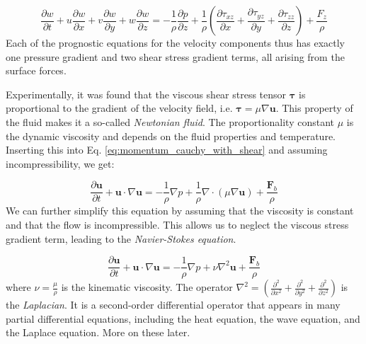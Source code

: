 \documentclass[12pt]{article}
\numberwithin{equation}{section}
\numberwithin{figure}{section}
\numberwithin{table}{section}
\begin{document}
\begin{equation}
  \frac{\partial w}{\partial t} + 
  u \frac{\partial w}{\partial x} + 
  v \frac{\partial w}{\partial y} + 
  w \frac{\partial w}{\partial z} = 
  - \frac{1}{\rho} \frac{\partial p}{\partial z} + 
  \frac{1}{\rho} \left( \frac{\partial \tau_{xz}}{\partial x} + \frac{\partial \tau_{yz}}{\partial y} + \frac{\partial \tau_{zz}}{\partial z} \right) + 
  \frac{F_z}{\rho}
\end{equation}
Each of the prognostic equations for the velocity components thus has exactly
one pressure gradient and two shear stress gradient terms, all arising from the
surface forces.

Experimentally, it was found that the viscous shear stress tensor $\boldsymbol{\tau}$
is proportional to the gradient of the velocity field, i.e. $\boldsymbol{\tau} = \mu \nabla \mathbf{u}$.
This property of the fluid makes it a so-called \textit{Newtonian fluid}.
The proportionality constant $\mu$ is the dynamic viscosity and depends on the
fluid properties and temperature.
Inserting this into Eq. \ref{eq:momentum_cauchy_with_shear} and assuming
incompressibility, we get:

\begin{equation}
  \frac{\partial \mathbf{u}}{\partial t} + \mathbf{u} \cdot \nabla \mathbf{u} =
  - \frac{1}{\rho} \nabla p + \frac{1}{\rho} \nabla \cdot (\mu \nabla \mathbf{u}) +
  \frac{\mathbf{F}_b}{\rho}
\end{equation}
We can further simplify this equation by assuming that the viscosity is constant
and that the flow is incompressible.
This allows us to neglect the viscous stress gradient term, leading to the
\textit{Navier-Stokes equation}.

\begin{equation}
  \frac{\partial \mathbf{u}}{\partial t} + \mathbf{u} \cdot \nabla \mathbf{u} =
  - \frac{1}{\rho} \nabla p + \nu \nabla^2 \mathbf{u} +
  \frac{\mathbf{F}_b}{\rho}
  \label{eq:momentum_navier_stokes}
\end{equation}
where $\nu = \frac{\mu}{\rho}$ is the kinematic viscosity.
The operator $\nabla^2 = \left( \frac{\partial^2}{\partial x^2} + \frac{\partial^2}{\partial y^2} + \frac{\partial^2}{\partial z^2} \right)$
is the \textit{Laplacian}.
It is a second-order differential operator that appears in many partial
differential equations, including the heat equation, the wave equation, and
the Laplace equation.
More on these later.
\end{document}

